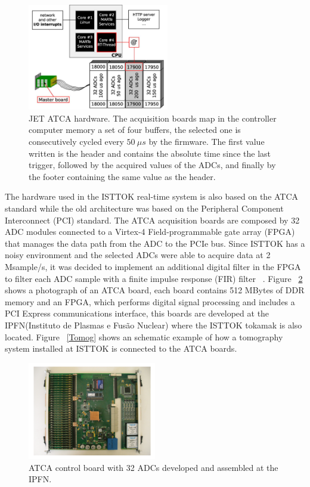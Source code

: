 \begin{figure}[htbp]
	\centering
	\includegraphics[width=0.55\textwidth]{Chp2/ATCA_JET.png}
	\caption{\label{ATCa_JET}  JET ATCA hardware. The acquisition boards map in the controller computer memory a set of four buffers, the selected one is consecutively cycled every $50~ \mu s$  by the firmware. The first value written is the header and contains the absolute time since the last trigger, followed by the acquired  values of the ADCs, and finally by the footer containing the same value as the header. ~\cite{Neto2010}}
	
\end{figure}



The hardware used in the ISTTOK real-time system is also  based on the ATCA standard while the old architecture was based on the Peripheral Component Interconnect (PCI) standard. The ATCA acquisition boards are composed by 32  ADC modules connected to a Virtex-4 Field-programmable gate array (FPGA) that manages the data path from the ADC to the PCIe bus.  Since ISTTOK has a noisy environment and the selected ADCs were able to acquire data at 2 Msample/s, it was decided to implement an additional digital filter in the FPGA to filter each ADC sample with a finite impulse response (FIR) filter ~\cite{ISTTOK_RT}. Figure ~\ref{PCIe} shows a photograph of an ATCA board, each board contains 512 MBytes of DDR memory and an FPGA, which performs digital signal processing and includes a PCI Express communications interface, this boards are developed at the IPFN(Instituto de Plasmas e Fus\~ao Nuclear) where the ISTTOK tokamak is also located. Figure ~\ref{Tomog} shows an schematic example of how a tomography system installed at ISTTOK is connected to the ATCA boards.  \smallskip 

\begin{figure}[htbp]
	\centering
	\includegraphics[width=0.5\textwidth]{Chp2/PCIboard.png}
	\caption{\label{PCIe}  ATCA control board with 32 ADCs developed and assembled  at the IPFN. \cite{ATCA2010}}
	
\end{figure}

